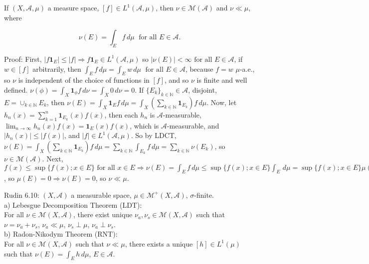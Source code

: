 \documentclass[12pt]{article}
\newcommand{\fall}[0] { \textrm{ for all } }
\newcommand{\nats}[0] { \mathbb{N}}
\newcommand{\A}[0] { \mathcal{A} }
\newcommand{\M}[0] { \mathcal{M} }
\newcommand{\rimply}[0] { \Rightarrow }
\newcommand{\rarw}[0] { \rightarrow }
\newcommand{ \cf }[1] { \mathbf{1}_{#1} }
\begin{document}

If $(X, \A, \mu)$ a measure space, $[f] \in L^1(\A,\mu)$, then $\nu \in \M(\A)$ and $\nu \ll \mu$, where

$$ \nu(E) = \int_E f \, d\mu \; \fall E \in \A.$$

\noindent
Proof: First, $|f \cf{E}| \le |f| \rimply f \cf{E} \in  L^1(\A,\mu)$ so $|\nu(E)| < \infty \fall E \in \A$, if $w \in [f]$ arbitrarily, then $\int_E f \, d\mu = \int_E w \, d\mu  \; \fall E \in \A $, because $f = w$ $\mu$-a.e., so $\nu$ is independent of the choice of functions in $[f]$, and so $\nu$ is finite and well defined. $\nu(\phi) = \int_X \cf{\phi} f \, d\nu = \int_X 0 \, d\nu = 0$. If $\{ E_k \}_{k \in \nats} \in \A$, disjoint, $E  = \cup_{k \in \nats} E_k$, then $\nu(E) = \int_X \cf{E} f \, d\mu = \int_X ( \sum_{k \in \nats} \cf{E_k} ) f \, d\mu$. Now, let $h_n(x) = \sum_{k=1}^n \cf{E_k}(x) f(x)$, then each $h_n$ is $\A$-measurable, $\lim_{n \rarw \infty} h_n(x) f(x) = \cf{E}(x) f(x)$, which is $\A$-measurable, and $|h_n(x)| \le |f(x)|$, and $|f| \in L^1(\A, \mu)$. So by LDCT, $\nu(E) = \int_X ( \sum_{k \in \nats} \cf{E_k} ) f \, d\mu  =  \sum_{k \in \nats} \int_{E_k}  f \, d\mu = \sum_{k \in \nats} \nu(E_k)$, so $\nu \in \M(\A)$. Next, $f(x) \le \sup \{ f(x); x \in E \} \fall x \in E \rimply \nu(E) = \int_E f \, d\mu \le \sup \{ f(x); x \in E \} \int_E \, d\mu = \sup \{ f(x); x \in E \} \mu(E)$, so $\mu(E) = 0 \rimply \nu(E) = 0$, so $\nu \ll \mu$.









\break

Rudin 6.10: $(X, \A)$ a measurable space, $\mu \in \M^+(X, \A)$, $\sigma$-finite. \\

\noindent 
a) Lebesgue Decomposition Theorem (LDT): \\

\noindent 
For all $\nu \in \M(X, \A)$, there exist unique $\nu_a, \nu_s \in \M(X, \A)$ such that $\nu = \nu_a + \nu_s$, $\nu_a \ll \mu$, $\nu_s \perp \mu$, $\nu_a \perp \nu_s$. \\

\noindent 
b) Radon-Nikodym Theorem (RNT): \\

\noindent 
For all $\nu \in \M(X, \A)$ such that $\nu \ll \mu$, there exists a unique $[h] \in L^1(\mu)$ such that $ \nu(E) = \int_E h \, d\mu $, $E \in \A$. \\
\end{document}

